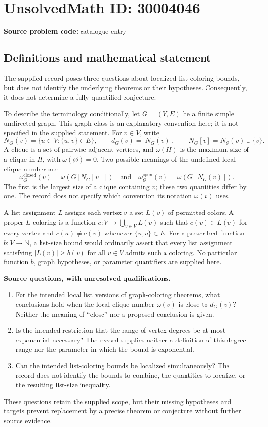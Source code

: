 \documentclass[11pt]{article}
\newcommand{\N}{\mathbb{N}}
\begin{document}
\section*{UnsolvedMath ID: 30004046}
\textbf{Source problem code:} catalogue entry
\subsection{Definitions and mathematical statement}
The supplied record poses three questions about localized list-coloring bounds, but does not identify the underlying theorems or their hypotheses. Consequently, it does not determine a fully quantified conjecture.

To describe the terminology conditionally, let \(G=(V,E)\) be a finite simple undirected graph. This graph class is an explanatory convention here; it is not specified in the supplied statement. For \(v\in V\), write
\[
N_G(v)=\{u\in V:\{u,v\}\in E\},\qquad d_G(v)=|N_G(v)|,\qquad N_G[v]=N_G(v)\cup\{v\}.
\]
A clique is a set of pairwise adjacent vertices, and \(\omega(H)\) is the maximum size of a clique in \(H\), with \(\omega(\varnothing)=0\). Two possible meanings of the undefined local clique number are
\[
\omega_G^{\mathrm{closed}}(v)=\omega(G[N_G[v]])
\quad\text{and}\quad
\omega_G^{\mathrm{open}}(v)=\omega(G[N_G(v)]).
\]
The first is the largest size of a clique containing \(v\); these two quantities differ by one. The record does not specify which convention its notation \(\omega(v)\) uses.

A list assignment \(L\) assigns each vertex \(v\) a set \(L(v)\) of permitted colors. A proper \(L\)-coloring is a function \(c:V\to\bigcup_{v\in V}L(v)\) such that \(c(v)\in L(v)\) for every vertex and \(c(u)\ne c(v)\) whenever \(\{u,v\}\in E\). For a prescribed function \(b:V\to\N\), a list-size bound would ordinarily assert that every list assignment satisfying \(|L(v)|\ge b(v)\) for all \(v\in V\) admits such a coloring. No particular function \(b\), graph hypotheses, or parameter quantifiers are supplied here.

\textbf{Source questions, with unresolved qualifications.}
\begin{enumerate}
\item For the intended local list versions of graph-coloring theorems, what conclusions hold when the local clique number \(\omega(v)\) is close to \(d_G(v)\)? Neither the meaning of ``close'' nor a proposed conclusion is given.
\item Is the intended restriction that the range of vertex degrees be at most exponential necessary? The record supplies neither a definition of this degree range nor the parameter in which the bound is exponential.
\item Can the intended list-coloring bounds be localized simultaneously? The record does not identify the bounds to combine, the quantities to localize, or the resulting list-size inequality.
\end{enumerate}
These questions retain the supplied scope, but their missing hypotheses and targets prevent replacement by a precise theorem or conjecture without further source evidence.
\end{document}

